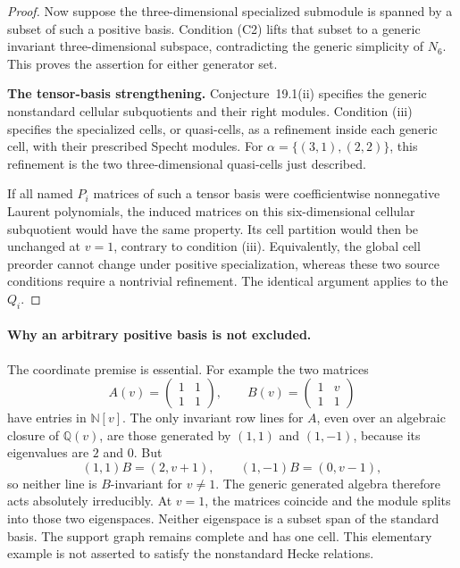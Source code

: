 \documentclass[11pt,a4paper]{article}
\newcommand{\Q}{\mathbb Q}\newcommand{\Z}{\mathbb Z}\newcommand{\C}{\mathbb C}\newcommand{\N}{\mathbb N}\newcommand{\F}{\mathbb F}
\theoremstyle{named}\newtheorem{finding}{Finding}[section]
\theoremstyle{definition}\newtheorem{definition}[finding]{Definition}
\theoremstyle{remark}\newtheorem{remark}[finding]{Remark}
\begin{document}
\begin{proof}
Now suppose the three-dimensional specialized submodule
is spanned by a subset of such a positive basis.
Condition (C2) lifts that subset to a generic invariant
three-dimensional subspace, contradicting the generic
simplicity of \(N_6\).
This proves the assertion for either generator set.

\par\smallskip\noindent\textbf{The tensor-basis strengthening.}\quad
Conjecture~19.1(ii) specifies the generic nonstandard
cellular subquotients and their right modules.
Condition (iii) specifies the specialized cells, or
quasi-cells, as a refinement inside each generic cell,
with their prescribed Specht modules.
For \(\alpha=\{(3,1),(2,2)\}\), this refinement is the
two three-dimensional quasi-cells just described.

If all named \(P_i\) matrices of such a tensor basis
were coefficientwise nonnegative Laurent polynomials,
the induced matrices on this six-dimensional cellular
subquotient would have the same property.
Its cell partition would then be unchanged at \(v=1\),
contrary to condition (iii).
Equivalently, the global cell preorder cannot change
under positive specialization, whereas these two source
conditions require a nontrivial refinement.
The identical argument applies to the \(Q_i\).
\end{proof}

\paragraph{Why an arbitrary positive basis is not excluded.}
The coordinate premise is essential.
For example the two matrices
\[
A(v)=\begin{pmatrix}1&1\\1&1\end{pmatrix},
\qquad
B(v)=\begin{pmatrix}1&v\\1&1\end{pmatrix}
\tag{C5}
\]
have entries in \(\mathbb N[v]\).
The only invariant row lines for \(A\), even over an
algebraic closure of \(\Q(v)\), are those generated by
\((1,1)\) and \((1,-1)\), because its eigenvalues are
\(2\) and \(0\).
But
\[
(1,1)B=(2,v+1),\qquad
(1,-1)B=(0,v-1),
\]
so neither line is \(B\)-invariant for \(v\ne1\).
The generic generated algebra therefore acts absolutely
irreducibly.
At \(v=1\), the matrices coincide and the module splits
into those two eigenspaces.
Neither eigenspace is a subset span of the standard basis.
The support graph remains complete and has one cell.
This elementary example is not asserted to satisfy the
nonstandard Hecke relations.
\end{document}
